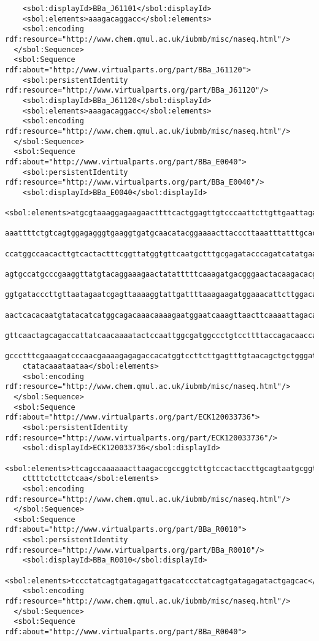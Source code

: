 \begin{lstlisting}
    <sbol:displayId>BBa_J61101</sbol:displayId>
    <sbol:elements>aaagacaggacc</sbol:elements>
    <sbol:encoding rdf:resource="http://www.chem.qmul.ac.uk/iubmb/misc/naseq.html"/>
  </sbol:Sequence>
  <sbol:Sequence rdf:about="http://www.virtualparts.org/part/BBa_J61120">
    <sbol:persistentIdentity rdf:resource="http://www.virtualparts.org/part/BBa_J61120"/>
    <sbol:displayId>BBa_J61120</sbol:displayId>
    <sbol:elements>aaagacaggacc</sbol:elements>
    <sbol:encoding rdf:resource="http://www.chem.qmul.ac.uk/iubmb/misc/naseq.html"/>
  </sbol:Sequence>
  <sbol:Sequence rdf:about="http://www.virtualparts.org/part/BBa_E0040">
    <sbol:persistentIdentity rdf:resource="http://www.virtualparts.org/part/BBa_E0040"/>
    <sbol:displayId>BBa_E0040</sbol:displayId>
    <sbol:elements>atgcgtaaaggagaagaacttttcactggagttgtcccaattcttgttgaattagatggtgatgttaatgggcac
    aaattttctgtcagtggagagggtgaaggtgatgcaacatacggaaaacttacccttaaatttatttgcactactggaaaactacctgtt
    ccatggccaacacttgtcactactttcggttatggtgttcaatgctttgcgagatacccagatcatatgaaacagcatgactttttcaag
    agtgccatgcccgaaggttatgtacaggaaagaactatatttttcaaagatgacgggaactacaagacacgtgctgaagtcaagtttgaa
    ggtgatacccttgttaatagaatcgagttaaaaggtattgattttaaagaagatggaaacattcttggacacaaattggaatacaactat
    aactcacacaatgtatacatcatggcagacaaacaaaagaatggaatcaaagttaacttcaaaattagacacaacattgaagatggaagc
    gttcaactagcagaccattatcaacaaaatactccaattggcgatggccctgtccttttaccagacaaccattacctgtccacacaatct
    gccctttcgaaagatcccaacgaaaagagagaccacatggtccttcttgagtttgtaacagctgctgggattacacatggcatggatgaa
    ctatacaaataataa</sbol:elements>
    <sbol:encoding rdf:resource="http://www.chem.qmul.ac.uk/iubmb/misc/naseq.html"/>
  </sbol:Sequence>
  <sbol:Sequence rdf:about="http://www.virtualparts.org/part/ECK120033736">
    <sbol:persistentIdentity rdf:resource="http://www.virtualparts.org/part/ECK120033736"/>
    <sbol:displayId>ECK120033736</sbol:displayId>
    <sbol:elements>ttcagccaaaaaacttaagaccgccggtcttgtccactaccttgcagtaatgcggtggacaggatcggcggtttt
    cttttctcttctcaa</sbol:elements>
    <sbol:encoding rdf:resource="http://www.chem.qmul.ac.uk/iubmb/misc/naseq.html"/>
  </sbol:Sequence>
  <sbol:Sequence rdf:about="http://www.virtualparts.org/part/BBa_R0010">
    <sbol:persistentIdentity rdf:resource="http://www.virtualparts.org/part/BBa_R0010"/>
    <sbol:displayId>BBa_R0010</sbol:displayId>
    <sbol:elements>tccctatcagtgatagagattgacatccctatcagtgatagagatactgagcac</sbol:elements>
    <sbol:encoding rdf:resource="http://www.chem.qmul.ac.uk/iubmb/misc/naseq.html"/>
  </sbol:Sequence>
  <sbol:Sequence rdf:about="http://www.virtualparts.org/part/BBa_R0040">

\end{lstlisting}

